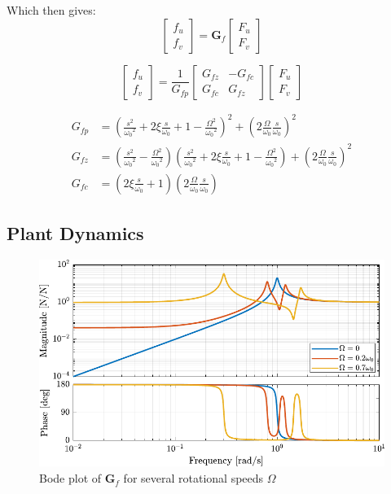 \documentclass{ISMA_USD2020}
\begin{document}
Which then gives:
\begin{equation}
\begin{bmatrix} f_{u} \\ f_{v} \end{bmatrix} =
\bm{G}_{f}
\begin{bmatrix} F_u \\ F_v \end{bmatrix}
\end{equation}

\begin{equation}
\begin{bmatrix} f_{u} \\ f_{v} \end{bmatrix} =
\frac{1}{G_{fp}}
\begin{bmatrix}
  G_{fz} & -G_{fc} \\
  G_{fc} &  G_{fz}
\end{bmatrix}
\begin{bmatrix} F_u \\ F_v \end{bmatrix}
\end{equation}

\begin{align}
  G_{fp} &= \left( \frac{s^2}{{\omega_0}^2} + 2 \xi \frac{s}{\omega_0} + 1 - \frac{{\Omega}^2}{{\omega_0}^2} \right)^2 + \left( 2 \frac{\Omega}{\omega_0} \frac{s}{\omega_0} \right)^2 \\
  G_{fz} &= \left( \frac{s^2}{{\omega_0}^2} - \frac{\Omega^2}{{\omega_0}^2} \right) \left( \frac{s^2}{{\omega_0}^2} + 2 \xi \frac{s}{\omega_0} + 1 - \frac{{\Omega}^2}{{\omega_0}^2} \right) + \left( 2 \frac{\Omega}{\omega_0} \frac{s}{\omega_0} \right)^2 \\
  G_{fc} &= \left( 2 \xi \frac{s}{\omega_0} + 1 \right) \left( 2 \frac{\Omega}{\omega_0} \frac{s}{\omega_0} \right)
\end{align}

\subsection{Plant Dynamics}
\label{sec:org392809f}

\begin{figure}[htbp]
\centering
\includegraphics[scale=1]{figs/plant_iff_compare_rotating_speed.pdf}
\caption{\label{fig:plant_iff_compare_rotating_speed}Bode plot of \(\bm{G}_f\) for several rotational speeds \(\Omega\)}
\end{figure}
\end{document}
